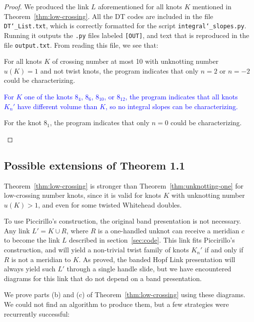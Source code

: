 \documentclass[11pt,usenames,dvipsnames,reqno]{amsart}
\numberwithin{theorem}{section}
\theoremstyle{ex}
\theoremstyle{rem}
\def\kh#1{\textcolor{Blue}{#1}}
\begin{document}
\begin{proof} We produced the link $L$ aforementioned for all knots $K$ mentioned in Theorem~\ref{thm:low-crossing}. All the DT codes are included in the file \texttt{DT\char`_List.txt}, which is correctly formatted for the script \texttt{integral\char`_slopes.py}. Running it outputs the \texttt{.py} files labeled \texttt{[OUT]}, and text that is reproduced in the file \texttt{output.txt}. From reading this file, we see that:
	\begin{enumerate}[label=\normalfont (\alph*)]
		\item For all knots $K$ of crossing number at most 10 with unknotting number $u(K) = 1$ and not twist knots, the program indicates that only $n = 2$ or $n = -2$ could be characterizing.
		\kh{\item For $K$ one of the knots $8_4$, $8_6$, $8_{10}$, or $8_{12}$, the program indicates that all knots $K_{n}'$ have different volume than $K$, so no integral slopes can be characterizing.}
		\item For the knot $8_1$, the program indicates that only $n = 0$ could be characterizing.
	\end{enumerate}
\end{proof}

\subsection{Possible extensions of Theorem 1.1}

Theorem~\ref{thm:low-crossing} is stronger than Theorem~\ref{thm:unknotting-one} for low-crossing number knots, since it is valid for knots $K$ with unknotting number $u(K) > 1$, and even for some twisted Whitehead doubles. 

To use Piccirillo's construction, the original band presentation is not necessary. Any link $L' = K\cup R$, where $R$ is a one-handled unknot can receive a meridian $c$ to become the link $L$ described in section~\ref{sec:code}. This link fits Piccirillo's construction, and will yield a non-trivial twist family of knots $K_{n}'$ if and only if $R$ is not a meridian to $K$. As proved, the banded Hopf Link presentation will always yield such $L'$ through a single handle slide, but we have encountered diagrams for this link that do not depend on a band presentation.

We prove parts (b) and (c) of Theorem~\ref{thm:low-crossing} using these diagrams. We could not find an algorithm to produce them, but a few strategies were recurrently successful:
\end{document}
